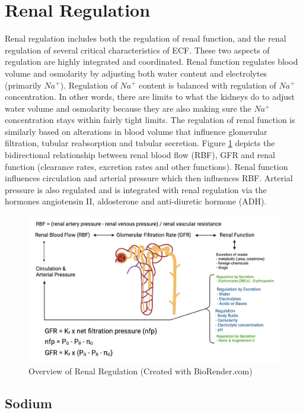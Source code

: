 \section{Renal Regulation}

Renal regulation includes both the regulation of renal function, and the renal regulation of several critical characteristics of ECF. These two aspects of regulation are highly integrated and coordinated. Renal function regulates blood volume and osmolarity by adjusting both water content and electrolytes (primarily $Na^+$). Regulation of $Na^+$ content is balanced with regulation of $Na^+$ concentration. In other words, there are limits to what the kidneys do to adjust water volume and osmolarity because they are also making sure the $Na^+$ concentration stays within fairly tight limits. The regulation of renal function is similarly based on alterations in blood volume that influence glomerular filtration, tubular reabsorption and tubular secretion. Figure \ref{fig:renal_regulation_intro} depicts the bidirectional relationship between renal blood flow (RBF), GFR and renal function (clearance rates, excretion rates and other functions). Renal function influences circulation and arterial pressure which then influences RBF. Arterial pressure is also regulated and is integrated with renal regulation via the hormones angiotensin II, aldosterone and anti-diuretic hormone (ADH). 

\begin{figure}[!h]
    \centering
    \includegraphics[width=1\linewidth]{./figure/renal_regulation_intro.png}
    \caption{Overview of Renal Regulation \footnotesize{(Created with BioRender.com)}}
    \label{fig:renal_regulation_intro}
\end{figure}


\subsection{Sodium}

